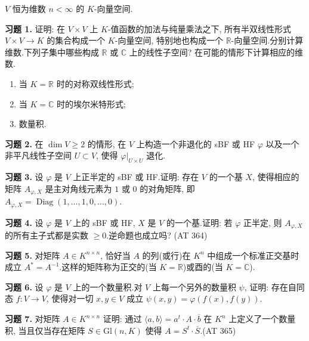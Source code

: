 \aufgaben

$V$ 恒为维数 $n < \infty$ 的 $K$-向量空间.

\medskip
\noindent\textbf{习题 1.} 证明: 在 $V \times V$ 上 $K$-值函数的加法与纯量乘法之下, 所有半双线性形式 $V \times V \longrightarrow K$ 的集合构成一个 $K$-向量空间, 特别地也构成一个 $\mathbb{R}$-向量空间.分别计算维数.下列子集中哪些构成 $\mathbb{R}$ 或 $\mathbb{C}$ 上的线性子空间? 在可能的情形下计算相应的维数.
\begin{enumerate}
\item[(i)] 当 $K = \mathbb{R}$ 时的对称双线性形式;
\item[(ii)] 当 $K = \mathbb{C}$ 时的埃尔米特形式;
\item[(iii)] 数量积.
\end{enumerate}

\medskip
\noindent\textbf{习题 2.} 在 $\dim V \geq 2$ 的情形, 在 $V$ 上构造一个非退化的 sBF 或 HF $\varphi$ 以及一个非平凡线性子空间 $U \subset V$, 使得 $\varphi|_{U \times U}$ 退化.

\medskip
\noindent\textbf{习题 3.} 设 $\varphi$ 是 $V$ 上正半定的 sBF 或 HF.证明: 存在 $V$ 的一个基 $X$, 使得相应的矩阵 $A_{\varphi, X}$ 是主对角线元素为 $1$ 或 $0$ 的对角矩阵, 即 $A_{\varphi, X} = \operatorname{Diag}(1, \ldots, 1, 0, \ldots, 0)$.

\medskip
\noindent\textbf{习题 4.} 设 $\varphi$ 是 $V$ 上的 sBF 或 HF, $X$ 是 $V$ 的一个基.证明: 若 $\varphi$ 正半定, 则 $A_{\varphi, X}$ 的所有主子式都是实数 $\geq 0$.逆命题也成立吗? (AT 364)

\medskip
\noindent\textbf{习题 5.} 对矩阵 $A \in K^{n \times n}$, 恰好当 $A$ 的列(或行)在 $K^n$ 中组成一个标准正交基时成立 $A^{*} = A^{-1}$.这样的矩阵称为正交的(当 $K = \mathbb{R}$)或酉的(当 $K = \mathbb{C}$).

\medskip
\noindent\textbf{习题 6.} 设 $\varphi$ 是 $V$ 上的一个数量积.对 $V$ 上每一个另外的数量积 $\psi$, 证明: 存在自同态 $f \colon V \longrightarrow V$, 使得对一切 $x, y \in V$ 成立 $\psi(x, y) = \varphi(f(x), f(y))$.

\medskip
\noindent\textbf{习题 7.} 对矩阵 $A \in K^{n \times n}$ 证明: 通过 $\langle a, b \rangle = a^{t} \cdot A \cdot \overline{b}$ 在 $K^n$ 上定义了一个数量积, 当且仅当存在矩阵 $S \in \mathrm{Gl}(n, K)$ 使得 $A = S^{t} \cdot \overline{S}$.(AT 365)


